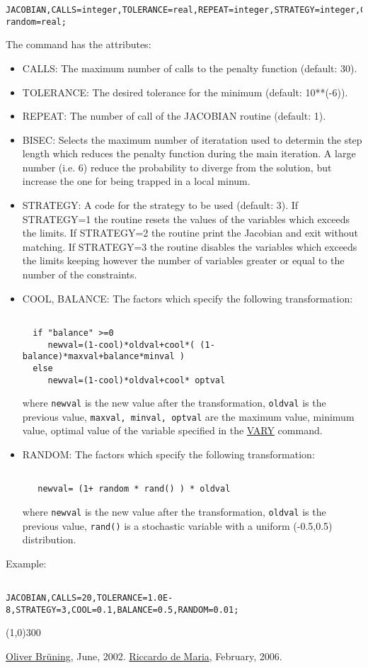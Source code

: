 \begin{itemize}
\begin{verbatim}
JACOBIAN,CALLS=integer,TOLERANCE=real,REPEAT=integer,STRATEGY=integer,COOL=real,BALANCE=real, random=real;
\end{verbatim} The command has the attributes: 
\begin{itemize}
	\item CALLS: The maximum number of calls to the penalty function (default: 30). 
	\item TOLERANCE: The desired tolerance for the minimum (default: 10**(-6)). 
	\item REPEAT: The number of call of the JACOBIAN routine (default: 1). 
	\item BISEC: Selects the maximum number of iteratation used to determin the step length which reduces the penalty function during the main iteration. A large number (i.e. 6) reduce the probability to diverge from the solution, but increase the one for being trapped in a local minum. 
	\item STRATEGY: A code for the strategy to be used (default: 3). If STRATEGY=1 the routine resets the values of the variables which exceeds the limits. If STRATEGY=2 the routine print the Jacobian and exit without matching. If STRATEGY=3 the routine  disables the variables which exceeds the limits keeping however the number of variables greater or equal to the number of the constraints. 
	\item COOL, BALANCE: The factors which specify the following transformation:
\begin{verbatim}

  if "balance" >=0
     newval=(1-cool)*oldval+cool*( (1-balance)*maxval+balance*minval )
  else
     newval=(1-cool)*oldval+cool* optval
\end{verbatim} where \texttt{newval} is the new value after the transformation, \texttt{oldval} is the previous value, \texttt{maxval, minval, optval} are the maximum value, minimum value, optimal value of the variable specified in the \href{match_vary.html}{VARY} command. 
	\item RANDOM: The factors which specify the following transformation:
\begin{verbatim}

   newval= (1+ random * rand() ) * oldval
\end{verbatim} where \texttt{newval} is the new value after the transformation, \texttt{oldval} is the previous value, \texttt{rand()} is a stochastic variable with a uniform (-0.5,0.5) distribution. 
\end{itemize} Example: 
\begin{verbatim}

JACOBIAN,CALLS=20,TOLERANCE=1.0E-8,STRATEGY=3,COOL=0.1,BALANCE=0.5,RANDOM=0.01;
\end{verbatim}
\end{itemize}

\line(1,0){300}

\href{http://bruening.home.cern.ch/bruening/}{Oliver Br\"uning}, June, 2002. \href{http://rdemaria.home.cern.ch/rdemaria/}{Riccardo de Maria}, February, 2006. 

